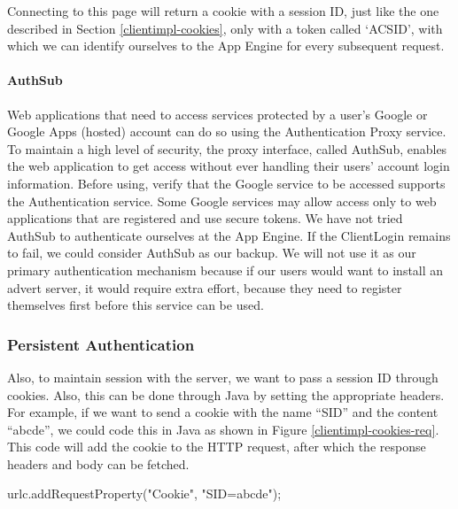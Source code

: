 Connecting to this page will return a cookie with a session ID, just like the
one described in Section \ref{clientimpl-cookies}, only with a token called
`ACSID', with which we can identify ourselves to the App Engine for every
subsequent request.

\paragraph{AuthSub}
Web applications that need to access services protected by a user's Google or
Google Apps (hosted) account can do so using the Authentication Proxy service. To
maintain a high level of security, the proxy interface, called AuthSub, enables
the web application to get access without ever handling their users' account
login information. Before using, verify that the Google service to be accessed
supports the Authentication service. Some Google services may allow access only
to web applications that are registered and use secure tokens. We have not tried
AuthSub to authenticate ourselves at the App Engine. If the ClientLogin remains
to fail, we could consider AuthSub as our backup. We will not use it as our
primary authentication mechanism because if our users would want to install an
advert server, it would require extra effort, because they need to register
themselves first before this service can be used.

\subsubsection{Persistent Authentication}
Also, to maintain session with the server, we want to pass a session ID through
cookies. Also, this can be done through Java by setting the appropriate headers.
For example, if we want to send a cookie with the name ``SID'' and the content
``abcde'', we could code this in Java as shown in Figure
\ref{clientimpl-cookies-req}. This code will add the cookie to the HTTP request,
after which the response headers and body can be fetched.

\begin{figure*}[ht] %
\begin{center}
\begin{code}
urlc.addRequestProperty("Cookie", "SID=abcde");
\end{code}
\caption{Sending cookies in Java.\label{clientimpl-cookies-req}}
\end{center}
\end{figure*}

